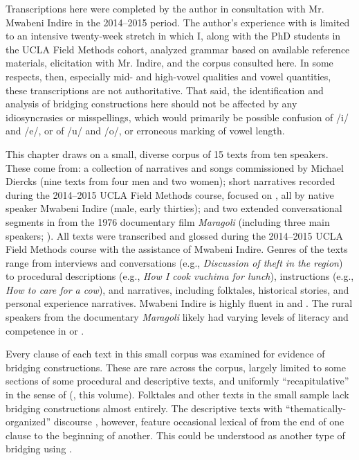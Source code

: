 \documentclass[output=paper]{LSP/langsci}
\begin{document}
Transcriptions here were completed by the author in consultation with Mr. Mwabeni Indire in the 2014--2015 period. The author’s experience with  is limited to an intensive twenty-week stretch in which I, along with the PhD students in the UCLA Field Methods cohort, analyzed  grammar based on available reference materials, elicitation with Mr. Indire, and the corpus consulted here. In some respects, then, especially mid- and high-vowel qualities and vowel quantities, these transcriptions are not authoritative. That said, the identification and analysis of bridging constructions here should not be affected by any idiosyncrasies or misspellings, which would primarily be possible confusion of /i/ and /e/, or of /u/ and /o/, or erroneous marking of vowel length. 

This chapter draws on a small, diverse corpus of 15  texts from ten speakers. These come from: a collection of  narratives and songs commissioned by Michael Diercks (nine texts from four men and two women); short narratives recorded during the 2014--2015 UCLA Field Methods course, focused on , all by native speaker Mwabeni Indire (male, early thirties); and two extended conversational segments in  from the 1976 documentary film \textit{Maragoli} (including three main  speakers; \citealt{Nichols1976}). All texts were transcribed and glossed during the 2014--2015 UCLA Field Methods course with the assistance of Mwabeni Indire. Genres of the texts range from interviews and conversations (e.g., \textit{Discussion of theft in the region}) to procedural descriptions (e.g., \textit{How I cook \emph{vuchima} for lunch}), instructions (e.g., \textit{How to care for a cow}), and narratives, including folktales, historical stories, and personal experience narratives. Mwabeni Indire is highly fluent in  and . The rural  speakers from the documentary \textit{Maragoli} likely had varying levels of literacy and competence in  or .

Every clause of each text in this small corpus was examined for evidence of bridging constructions. These are rare across the corpus, largely limited to some sections of some procedural and descriptive texts, and uniformly ``recapitulative'' in the sense of \citeauthor{guerin18} (, this volume). Folktales and other  texts in the small sample lack bridging constructions almost entirely. The descriptive texts with ``thematically-organized'' discourse \citep{farr99}, however, feature occasional lexical  of  from the end of one clause to the beginning of another. This could be understood as another type of bridging using .
\end{document}
